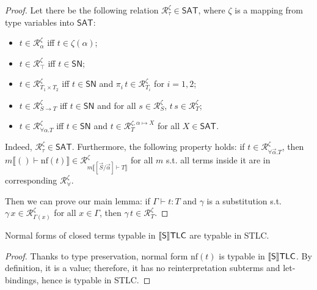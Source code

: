 \begin{proof}
    Let there be the following relation
    $\mathcal{R}_\tau^\zeta\in\mathsf{SAT}$, where
    $\zeta$ is a mapping from type variables into
    $\mathsf{SAT}$:
    \begin{itemize}
        \item $t\in\mathcal{R}_\alpha^\zeta$ iff
            $t\in\zeta(\alpha)$;
        \item $t\in\mathcal{R}_\top^\zeta$ iff
            $t\in\mathsf{SN}$;
        \item $t\in\mathcal{R}_{T_1\times T_2}^\zeta$
            iff $t\in\mathsf{SN}$ and
            $\pi_i\,t\in\mathcal{R}_{T_i}^\zeta$
            for $i=1,2$;
        \item $t\in\mathcal{R}_{S\to T}^\zeta$ iff
            $t\in\mathsf{SN}$ and for all
            $s\in\mathcal{R}_S^\zeta$,
            $t\,s\in\mathcal{R}_T^\zeta$;
        \item $t\in\mathcal{R}_{\forall\alpha.T
            }^\zeta$ iff $t\in\mathsf{SN}$ and
            $t\in\mathcal{R}_T^{\zeta,\alpha\mapsto X}$
            for all $X\in\mathsf{SAT}$.
    \end{itemize}

    Indeed, $\mathcal{R}_\tau^\zeta\in\mathsf{SAT}$.
    Furthermore, the following property holds: if
    $t\in\mathcal{R}_{\forall\vec{\alpha}.T}^\zeta$,
    then $m\llbracket()\vdash\mathrm{nf}(t)\rrbracket
    \in\mathcal{R}^\zeta_{m\llbracket[\vec{S}/
    \vec{\alpha}]\vdash T\rrbracket}$ for all
    $m$ s.t. all terms inside it are in corresponding
    $\mathcal{R}_\forall^\zeta$.

    Then we can prove our main lemma: if
    $\Gamma\vdash t:T$ and $\gamma$ is a substitution
    s.t. $\gamma\,x\in\mathcal{R}_{\Gamma(x)}^\zeta$ for
    all $x\in\Gamma$, then $\gamma\,t\in
    \mathcal{R}_T^\zeta$.
\end{proof}

\begin{theorem}
    Normal forms of closed terms typable in $\llbracket\mathsf{S}\rrbracket\mathsf{TLC}$ are
    typable in STLC.
\end{theorem}
\begin{proof}
    Thanks to type preservation, normal form
    $\mathrm{nf}(t)$ is typable in $\llbracket\mathsf{S}\rrbracket\mathsf{TLC}$. By
    definition, it is a value; therefore, it has no
    reinterpretation subterms and let-bindings, hence is
    typable in STLC.
\end{proof}

